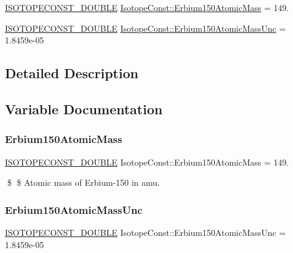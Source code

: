 \begin{DoxyCompactItemize}
\item 
\mbox{\hyperlink{group___isotope_const-_macros_ga8f45a7272ce02c0b4c65c44636ed719a}{I\+S\+O\+T\+O\+P\+E\+C\+O\+N\+S\+T\+\_\+\+D\+O\+U\+B\+LE}} \mbox{\hyperlink{group___isotope_const-_erbium-_er150_gaa3eda431eee26290d52afbd49c2413c9}{Isotope\+Const\+::\+Erbium150\+Atomic\+Mass}} = 149.
\item 
\mbox{\hyperlink{group___isotope_const-_macros_ga8f45a7272ce02c0b4c65c44636ed719a}{I\+S\+O\+T\+O\+P\+E\+C\+O\+N\+S\+T\+\_\+\+D\+O\+U\+B\+LE}} \mbox{\hyperlink{group___isotope_const-_erbium-_er150_gaff0128b189de6bb9b9019b16e68d7156}{Isotope\+Const\+::\+Erbium150\+Atomic\+Mass\+Unc}} = 1.\+8459e-\/05
\end{DoxyCompactItemize}


\subsection{Detailed Description}


\subsection{Variable Documentation}
\mbox{\label{group___isotope_const-_erbium-_er150_gaa3eda431eee26290d52afbd49c2413c9}} 
\subsubsection{\texorpdfstring{Erbium150\+Atomic\+Mass}{Erbium150AtomicMass}}
{\footnotesize\ttfamily \mbox{\hyperlink{group___isotope_const-_macros_ga8f45a7272ce02c0b4c65c44636ed719a}{I\+S\+O\+T\+O\+P\+E\+C\+O\+N\+S\+T\+\_\+\+D\+O\+U\+B\+LE}} Isotope\+Const\+::\+Erbium150\+Atomic\+Mass = 149.}

\$ \$ Atomic mass of Erbium-\/150 in amu. \mbox{\label{group___isotope_const-_erbium-_er150_gaff0128b189de6bb9b9019b16e68d7156}} 
\subsubsection{\texorpdfstring{Erbium150\+Atomic\+Mass\+Unc}{Erbium150AtomicMassUnc}}
{\footnotesize\ttfamily \mbox{\hyperlink{group___isotope_const-_macros_ga8f45a7272ce02c0b4c65c44636ed719a}{I\+S\+O\+T\+O\+P\+E\+C\+O\+N\+S\+T\+\_\+\+D\+O\+U\+B\+LE}} Isotope\+Const\+::\+Erbium150\+Atomic\+Mass\+Unc = 1.\+8459e-\/05}

